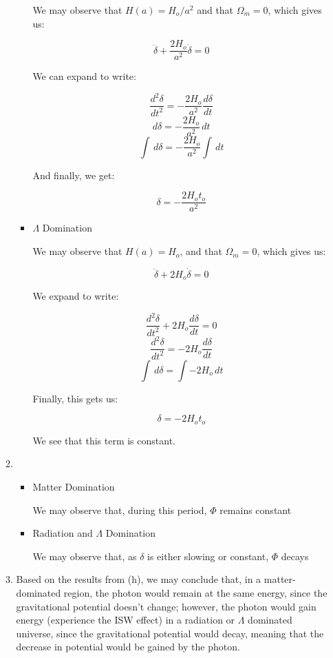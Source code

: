 \begin{enumerate}
\begin{enumerate}
\begin{itemize}
            We may observe that $H(a)=H_o/a^2$ and that $\Omega_m=0$, which gives us:

            $$\ddot{\delta}+\frac{2H_o}{a^2}\dot{\delta}=0$$

            We can expand to write:

            $$\frac{d^2\delta}{dt^2}=-\frac{2H_o}{a^2}\frac{d\delta}{dt}$$
            $$d\delta=-\frac{2H_o}{a^2}\,dt$$
            $$\int\,d\delta=-\frac{2H_o}{a^2}\int\,dt$$

            And finally, we get:

            $$\boxed{\delta = -\frac{2H_ot_o}{a^2}}$$

          \item $\Lambda$ Domination

            We may observe that $H(a)=H_o$, and that $\Omega_m=0$, which gives us:

            $$\ddot{\delta}+2H_o\dot{\delta}=0$$

            We expand to write:

            $$\frac{d^2\delta}{dt^2}+2H_o\frac{d\delta}{dt}=0$$
            $$\frac{d^2\delta}{dt^2}=-2H_o\frac{d\delta}{dt}$$
            $$\int\,d\delta=\int-2H_o\,dt$$

            Finally, this gets us:

            $$\boxed{\delta=-2H_ot_o}$$

            We see that this term is constant.

        \end{itemize}

      \item 

        \begin{itemize}

          \item Matter Domination

            We may observe that, during this period, $\Phi$ remains constant

          \item Radiation and $\Lambda$ Domination

            We may observe that, as $\delta$ is either slowing or constant, $\Phi$ decays

        \end{itemize}

      \item Based on the results from (h), we may conclude that, in a matter-dominated region, the photon would remain at the same energy, since the gravitational potential doesn't change; however, the photon would gain energy (experience the ISW effect) in a radiation or $\Lambda$ dominated universe, since the gravitational potential would decay, meaning that the decrease in potential would be gained by the photon.


\end{enumerate}
\end{enumerate}
